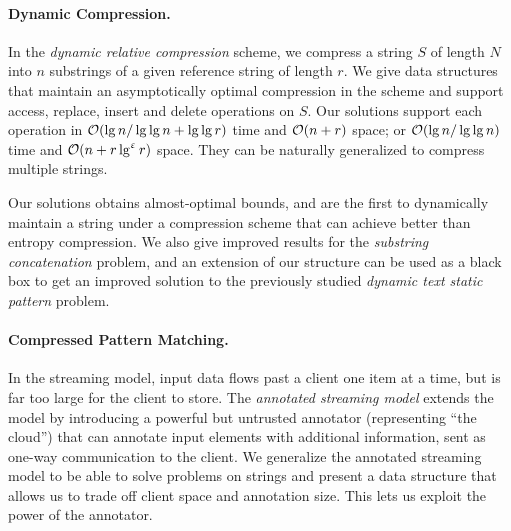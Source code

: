 \paragraph{Dynamic Compression.}
In the \emph{dynamic relative compression} scheme, we compress a string $S$ of length $N$ into $n$ substrings of a given reference string of length $r$. 
We give data structures that maintain an asymptotically optimal compression in the scheme and support access, replace, insert and delete operations on $S$. 
Our solutions support each operation in $\mathcal{O}(\lg n / \lg \lg n + \lg \lg r)$ time and $\mathcal{O}(n+r)$ space; or $\mathcal{O}(\lg n / \lg \lg n)$ time and $\mathcal{O}(n+r \lg^{\upvarepsilon} r)$ space. They can be naturally generalized to compress multiple strings.

Our solutions obtains almost-optimal bounds, and are the first to dynamically maintain a string under a compression scheme that can achieve better than entropy compression. 
We also give improved results for the \emph{substring concatenation} problem, and an extension of our structure can be used as a black box to get an improved solution to the previously studied \emph{dynamic text static pattern} problem.


\paragraph{Compressed Pattern Matching.}
In the streaming model, input data flows past a client one item at a time, but is far too large for the client to store. 
The \emph{annotated streaming model} extends the model by introducing a powerful but untrusted annotator (representing ``the cloud'') that can annotate input elements with additional information, sent as one-way communication to the client. 
We generalize the annotated streaming model to be able to solve problems on strings and present a data structure that allows us to trade off client space and annotation size. This lets us exploit the power of the annotator.

